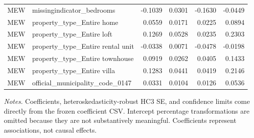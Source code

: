 \begin{landscape}
\begin{longtable}{>{\raggedright\arraybackslash}p{2cm}>{\raggedright\arraybackslash}p{9cm}rrrr}
MEW & missingindicator\_\allowbreak{}bedrooms & -0.1039 & 0.0301 & -0.1630 & -0.0449 \\
MEW & property\_\allowbreak{}type\_\allowbreak{}Entire home & 0.0559 & 0.0171 & 0.0225 & 0.0894 \\
MEW & property\_\allowbreak{}type\_\allowbreak{}Entire loft & 0.1269 & 0.0528 & 0.0235 & 0.2303 \\
MEW & property\_\allowbreak{}type\_\allowbreak{}Entire rental unit & -0.0338 & 0.0071 & -0.0478 & -0.0198 \\
MEW & property\_\allowbreak{}type\_\allowbreak{}Entire townhouse & 0.0919 & 0.0262 & 0.0405 & 0.1433 \\
MEW & property\_\allowbreak{}type\_\allowbreak{}Entire villa & 0.1283 & 0.0441 & 0.0419 & 0.2146 \\
MEW & official\_\allowbreak{}municipality\_\allowbreak{}code\_\allowbreak{}0147 & 0.0331 & 0.0104 & 0.0126 & 0.0536 \\
\bottomrule
\end{longtable}
{\footnotesize\noindent\emph{Notes.} Coefficients, heteroskedasticity-robust HC3 SE, and confidence limits come directly from the frozen coefficient CSV. Intercept percentage transformations are omitted because they are not substantively meaningful. Coefficients represent associations, not causal effects.\par}
\end{landscape}
